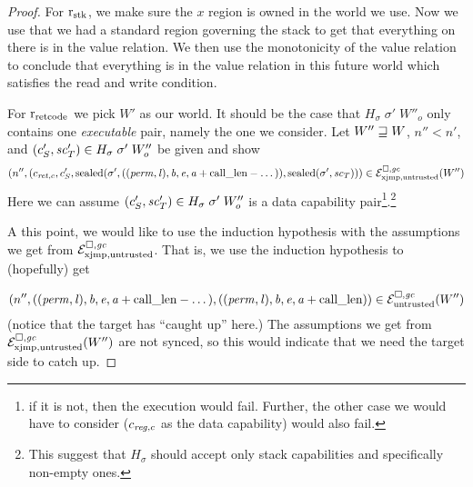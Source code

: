 \documentclass[a4paper]{article}
\begin{document}
\begin{proof}
For $\rstk$, we make sure the $x$ region is owned in the world we use. Now we use that we had a standard region governing the stack to get that everything on there is in the value relation. We then use the monotonicity of the value relation to conclude that everything is in the value relation in this future world which satisfies the read and write condition.

For $\rretc$ we pick $W'$ as our world. It should be the case that $H_\sigma \; \sigma' \; W''_o$ only contains one \emph{executable} pair, namely the one we consider. Let $W'' \future W$, $n''<n'$, and $(c_S',\vsc_T') \in H_\sigma \; \sigma' \; W''_o$ be given and show
\[
  \npair[n'']{(c_{\ret,c},c_S',\sealed{\sigma',((\perm,\lin),\baddr,\eaddr,\aaddr+\calllen-\dots)},\sealed{\sigma',\vsc_T})} \in \lrexj(W'')
\]
Here we can assume $(c_S',\vsc_T') \in H_\sigma \; \sigma' \;W''_o$ is a data capability pair\footnote{if it is not, then the execution would fail. Further, the other case we would have to consider ($c_{\reg,c}$ as the data capability) would also fail.}.\footnote{{\color{red}This suggest that $H_\sigma$ should accept only stack capabilities and specifically non-empty ones.}}

{\color{DarkRed}
  A this point, we would like to use the induction hypothesis with the assumptions we get from $\lrexj$. That is, we use the induction hypothesis to (hopefully) get

\[
  \npair[n'']{((\perm,\lin),\baddr,\eaddr,\aaddr+\calllen-\dots),((\perm,\lin),\baddr,\eaddr,\aaddr+\calllen)} \in \lre(W'')
\]
(notice that the target has ``caught up'' here.) The assumptions we get from $\lrexj(W'')$ are not synced, so this would indicate that we need the target side to catch up.
}


\end{proof}
\end{document}
